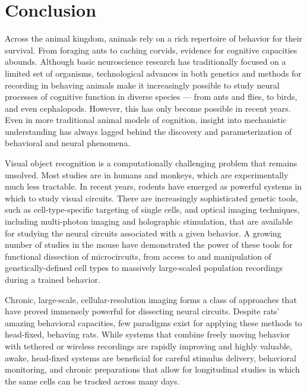 \chapter{Conclusion}
\label{conclusion}
Across the animal kingdom, animals rely on a rich repertoire of behavior for their survival. From foraging ants to caching corvids, evidence for cognitive capacities abounds. Although basic neuroscience research has traditionally focused on a limited set of organisms, technological advances in both genetics and methods for recording in behaving animals make it increasingly possible to study neural processes of cognitive function in diverse species --- from ants\cite{Trible2017OrcoAnts} and flies\cite{Seelig2015,Haberkern2016}, to birds\cite{Clayton2009,Jarvis2014}, and even cephalopods\cite{Albertin2015, Crawford2020}. However, this has only become possible in recent years. Even in more traditional animal models of cognition, insight into mechanistic understanding has always lagged behind the discovery and parameterization of behavioral and neural phenomena.

Visual object recognition is a computationally challenging problem that remains unsolved. Most studies are in humans and monkeys, which are experimentally much less tractable. In recent years, rodents have emerged as powerful systems in which to study visual circuits. There are increasingly sophisticated genetic tools, such as cell-type-specific targeting of single cells, and optical imaging techniques, including multi-photon imaging and  holographic stimulation, that are available for studying the neural circuits associated with a given behavior. A growing number of studies in the mouse have demonstrated the power of these tools for functional dissection of microcircuits, from access to and manipulation of genetically-defined cell types to massively large-scaled population recordings during a trained behavior.

Chronic, large-scale, cellular-resolution imaging forms a class of approaches that have proved immensely powerful for dissecting neural circuits. Despite rats’ amazing behavioral capacities, few paradigms exist for applying these methods to head-fixed, behaving rats. While systems that combine freely moving behavior with tethered or wireless recordings are rapidly improving and highly valuable, awake, head-fixed systems are beneficial for careful stimulus delivery, behavioral monitoring, and chronic preparations that allow for longitudinal studies in which the same cells can be tracked across many days.   

